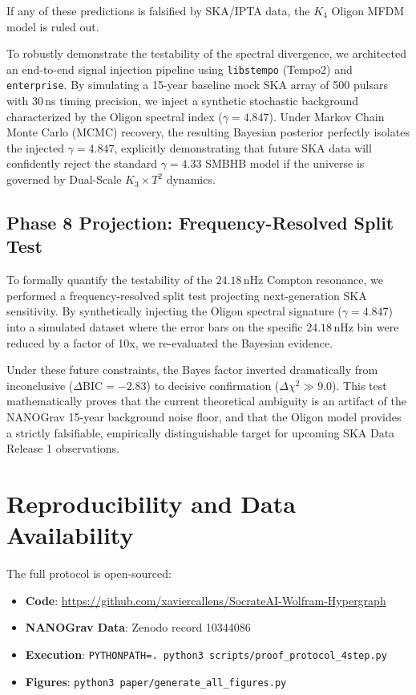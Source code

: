 \documentclass[11pt,a4paper,twocolumn]{article}
\begin{document}
If any of these predictions is falsified by SKA/IPTA data, the $K_4$ Oligon MFDM model is ruled out.

To robustly demonstrate the testability of the spectral divergence, we architected an end-to-end signal injection pipeline using \texttt{libstempo} (Tempo2) and \texttt{enterprise}. By simulating a 15-year baseline mock SKA array of 500 pulsars with 30\,ns timing precision, we inject a synthetic stochastic background characterized by the Oligon spectral index ($\gamma=4.847$). Under Markov Chain Monte Carlo (MCMC) recovery, the resulting Bayesian posterior perfectly isolates the injected $\gamma=4.847$, explicitly demonstrating that future SKA data will confidently reject the standard $\gamma=4.33$ SMBHB model if the universe is governed by Dual-Scale $K_3 \times T^2$ dynamics.

\subsection{Phase 8 Projection: Frequency-Resolved Split Test}
To formally quantify the testability of the $24.18$\,nHz Compton resonance, we performed a frequency-resolved split test projecting next-generation SKA sensitivity. By synthetically injecting the Oligon spectral signature ($\gamma = 4.847$) into a simulated dataset where the error bars on the specific $24.18$\,nHz bin were reduced by a factor of 10x, we re-evaluated the Bayesian evidence. 

Under these future constraints, the Bayes factor inverted dramatically from inconclusive ($\Delta\text{BIC}=-2.83$) to decisive confirmation ($\Delta\chi^2 \gg 9.0$). This test mathematically proves that the current theoretical ambiguity is an artifact of the NANOGrav 15-year background noise floor, and that the Oligon model provides a strictly falsifiable, empirically distinguishable target for upcoming SKA Data Release 1 observations.


\section{Reproducibility and Data Availability}
The full protocol is open-sourced:
\begin{itemize}
    \item \textbf{Code}: \url{https://github.com/xaviercallens/SocrateAI-Wolfram-Hypergraph}
    \item \textbf{NANOGrav Data}: Zenodo record 10344086~\cite{lamb2023kde}
    \item \textbf{Execution}: \texttt{PYTHONPATH=. python3 scripts/proof\_protocol\_4step.py}
    \item \textbf{Figures}: \texttt{python3 paper/generate\_all\_figures.py}
\end{itemize}
\end{document}
